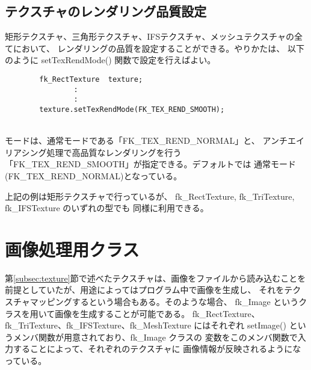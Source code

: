 \subsection{テクスチャのレンダリング品質設定}
矩形テクスチャ、三角形テクスチャ、IFSテクスチャ、メッシュテクスチャの全てにおいて、
レンダリングの品質を設定することができる。やりかたは、
以下のように setTexRendMode() 関数で設定を行えばよい。
\\
\begin{screen}
\begin{verbatim}
        fk_RectTexture  texture;
                :
                :
        texture.setTexRendMode(FK_TEX_REND_SMOOTH);
\end{verbatim}
\end{screen}
~ \\
モードは、通常モードである「FK\_TEX\_REND\_NORMAL」と、
アンチエイリアシング処理で高品質なレンダリングを行う
「FK\_TEX\_REND\_SMOOTH」が指定できる。デフォルトでは
通常モード(FK\_TEX\_REND\_NORMAL)となっている。

上記の例は矩形テクスチャで行っているが、
fk\_RectTexture, fk\_TriTexture, fk\_IFSTexture のいずれの型でも
同様に利用できる。

\section{画像処理用クラス} \label{subsec:image}
第\ref{subsec:texture}節で述べたテクスチャは、画像をファイルから読み込むことを
前提としていたが、用途によってはプログラム中で画像を生成し、
それをテクスチャマッピングするという場合もある。そのような場合、
fk\_Image というクラスを用いて画像を生成することが可能である。
fk\_RectTexture、fk\_TriTexture、fk\_IFSTexture、fk\_MeshTexture にはそれぞれ
setImage() というメンバ関数が用意されており、fk\_Image クラスの
変数をこのメンバ関数で入力することによって、それぞれのテクスチャに
画像情報が反映されるようになっている。


